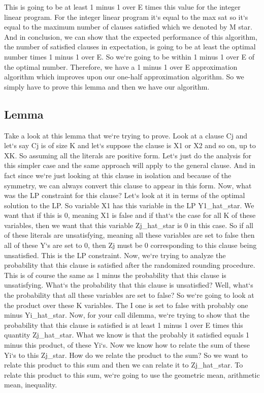 This is going to be at least 1 minus 1 over E times this value for the integer linear program.
For the integer linear program it`s equal to the max sat so it`s equal to the maximum number of clauses satisfied which we denoted by M star.
And in conclusion, we can show that the expected performance of this algorithm, the number of satisfied clauses in expectation, is going to be at least the optimal number times 1 minus 1 over E\@.
So we`re going to be within 1 minus 1 over E of the optimal number.
Therefore, we have a 1 minus 1 over E approximation algorithm which improves upon our one-half approximation algorithm.
So we simply have to prove this lemma and then we have our algorithm.

\subsection{Lemma}
Take a look at this lemma that we`re trying to prove.
Look at a clause Cj and let`s say Cj is of size K and let`s suppose the clause is X1 or X2 and so on, up to XK\@.
So assuming all the literals are positive form.
Let`s just do the analysis for this simpler case and the same approach will apply to the general clause.
And in fact since we`re just looking at this clause in isolation and because of the symmetry, we can always convert this clause to appear in this form.
Now, what was the LP constraint for this clause? Let`s look at it in terms of the optimal solution to the LP\@.
So variable X1 has this variable in the LP Y1\_hat\_star.
We want that if this is 0, meaning X1 is false and if that`s the case for all K of these variables, then we want that this variable Zj\_hat\_star is 0 in this case.
So if all of these literals are unsatisfying, meaning all these variables are set to false then all of these Y`s are set to 0, then Zj must be 0 corresponding to this clause being unsatisfied.
This is the LP constraint.
Now, we`re trying to analyze the probability that this clause is satisfied after the randomized rounding procedure.
This is of course the same as 1 minus the probability that this clause is unsatisfying.
What`s the probability that this clause is unsatisfied? Well, what`s the probability that all these variables are set to false? So we`re going to look at the product over these K variables.
The I one is set to false with probably one minus Yi\_hat\_star.
Now, for your call dilemma, we`re trying to show that the probability that this clause is satisfied is at least 1 minus 1 over E times this quantity Zj\_hat\_star.
What we know is that the probably it satisfied equals 1 minus this product, of these Yi`s.
Now we know how to relate the sum of these Yi`s to this Zj\_star.
How do we relate the product to the sum? So we want to relate this product to this sum and then we can relate it to Zj\_hat\_star.
To relate this product to this sum, we`re going to use the geometric mean, arithmetic mean, inequality.

